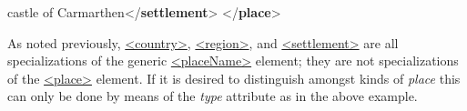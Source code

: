 \begin{shaded}
\hspace*{1em}\hspace*{1em}\mbox{}\newline 
\hspace*{1em}\hspace*{1em}\hspace*{1em}castle of Carmarthen{</\textbf{settlement}>}\mbox{}\newline 
\hspace*{1em}\hspace*{1em}\mbox{}\newline 
\hspace*{1em}\mbox{}\newline 
{}\mbox{}\newline 
{</\textbf{place}>}\end{shaded}\egroup\par \par
As noted previously, \hyperref[TEI.country]{<country>}, \hyperref[TEI.region]{<region>}, and \hyperref[TEI.settlement]{<settlement>} are all specializations of the generic \hyperref[TEI.placeName]{<placeName>} element; they are not specializations of the \hyperref[TEI.place]{<place>} element. If it is desired to distinguish amongst kinds of \textit{place} this can only be done by means of the {\itshape type} attribute as in the above example.\par
